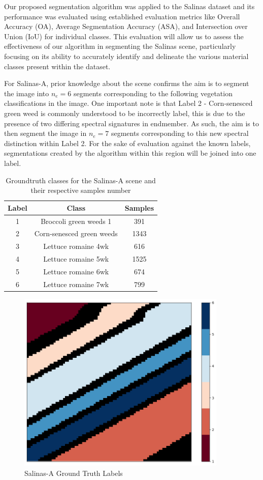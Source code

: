 Our proposed segmentation algorithm was applied to the Salinas dataset and its performance was evaluated using established evaluation metrics like Overall Accuracy (OA), Average Segmentation Accuracy (ASA), and Intersection over Union (IoU) for individual classes. This evaluation will allow us to assess the effectiveness of our algorithm in segmenting the Salinas scene, particularly focusing on its ability to accurately identify and delineate the various material classes present within the dataset.

For Salinas-A, prior knowledge about the scene confirms the aim is to segment the image into $n_e = 6$ segments corresponding to the following vegetation classifications in the image. One important note is that Label 2 - Corn-senesced green weed is commonly understood to be incorrectly label, this is due to the presence of two differing spectral signatures in endmember. As such, the aim is to then segment the image in $n_e = 7$ segments corresponding to this new spectral distinction within Label 2. For the sake of evaluation against the known labels, segmentations created by the algorithm within this region will be joined into one label.
\begin{table}[H]
    \centering
    \label{tab:salinas_classes}
    \begin{tabular}{|c|c|c|}
    \hline
    \textbf{Label} & \textbf{Class} & \textbf{Samples} \\
    \hline
    1 & Broccoli green weeds 1 & 391 \\
    2 & Corn-senesced green weeds & 1343 \\
    3 &Lettuce romaine 4wk & 616 \\
    4 & Lettuce romaine 5wk & 1525 \\
    5 & Lettuce romaine 6wk & 674 \\
    6 &Lettuce romaine 7wk & 799 \\
    \hline
    \end{tabular}
    \caption{Groundtruth classes for the Salinas-A scene and their respective samples number}
\end{table}
\begin{figure}[h]
    \centering
    \includegraphics[width=10cm]{salinas-a-error.png}  %
    \caption{Salinas-A Ground Truth Labels}
    \label{salina-a}  %
  \end{figure}
